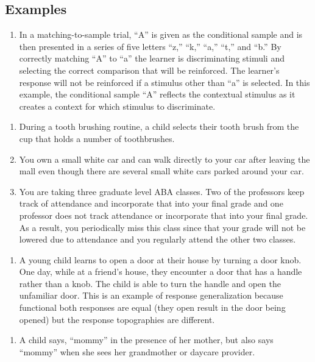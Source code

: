 \subsection{Examples}
\begin{enumerate}
\item In a matching-to-sample trial, ``A'' is given as the conditional sample and is then presented in a series of five letters ``z,'' ``k,'' ``a,'' ``t,'' and ``b.''  By correctly matching ``A'' to ``a'' the learner is discriminating stimuli and selecting the correct comparison that will be reinforced.  The learner's response will not be reinforced if a stimulus other than ``a'' is selected.  In this example, the conditional sample ``A'' reflects the contextual stimulus as it creates a context for which stimulus to discriminate.  
\end{enumerate}
%
\begin{enumerate}
\item During a tooth brushing routine, a child selects their tooth brush from the cup that holds a number of toothbrushes.
\item You own a small white car and can walk directly to your car after leaving the mall even though there are several small white cars parked around your car.
\item You are taking three graduate level ABA classes.  Two of the professors keep track of attendance and incorporate that into your final grade and one professor does not track attendance or incorporate that into your final grade.  As a result, you periodically miss this class since that your grade will not be lowered due to attendance and you regularly attend the other two classes. 
\end{enumerate}
%
\begin{enumerate}
\item A young child learns to open a door at their house by turning a door knob. One day, while at a friend's house, they encounter a door that has a handle rather than a knob. The child is able to turn the handle and open the unfamiliar door. This is an example of response generalization because functional both responses are equal (they open result in the door being opened) but the response topographies are different.
%
\end{enumerate}
%
\begin{enumerate}
\item  A child says, ``mommy'' in the presence of her mother, but also says ``mommy'' when she sees her grandmother or daycare provider.
\end{enumerate}
